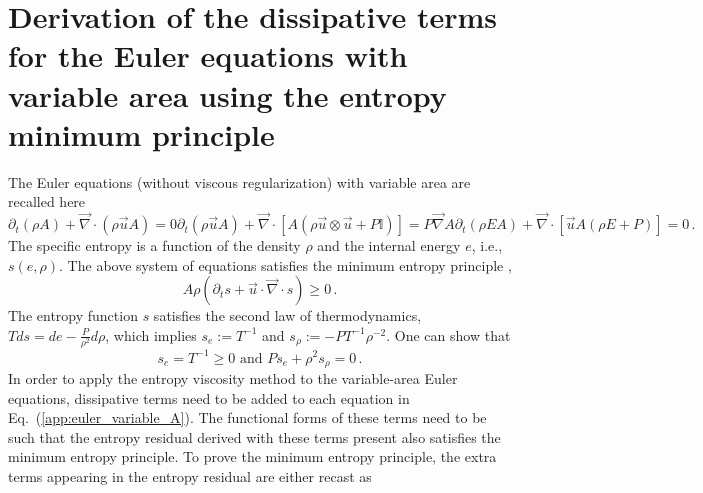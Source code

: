 \documentclass[preprint,10pt]{elsarticle}
\renewcommand{\div}{\vec{\nabla}\! \cdot \!}
\newcommand{\grad}{\vec{\nabla}}
\newcommand{\eqt}[1]{Eq.~(\ref{#1})}                     %
\begin{document}
\section{Derivation of the dissipative terms for the Euler equations with variable area using the entropy minimum principle} \label{app:diss_terms}
%
The Euler equations (without viscous regularization) with variable area are recalled here
%
\begin{subequations}
\label{app:euler_variable_A}
%
\begin{equation}
\partial_t \left( \rho A \right) + \div \left( \rho \vec{u} A \right) = 0 
\end{equation}
%
\begin{equation}
\partial_t \left( \rho \vec{u} A \right) + \div \left[A\left( \rho \vec{u} \otimes \vec{u} + P \mathbb{I} \right) \right] = P \grad A 
\end{equation}
% 
\begin{equation}
\partial_t \left( \rho E A \right) + \div \left[ \vec{u} A \left( \rho E + P \right) \right] = 0 \,.
\end{equation}
\end{subequations}
%
The specific entropy is a function of the density $\rho$ and the internal energy $e$, i.e., $s(e,\rho)$. The 
above system of equations satisfies the minimum entropy principle \cite{Leveque},
%
\begin{equation}
A \rho \left( \partial_t s + \vec{u} \cdot \div s \right) \geq 0 \, .
\end{equation}
%
The entropy function $s$ satisfies the second law of thermodynamics, $T ds = de - \frac{P}{\rho^2} d \rho$, 
which implies $s_e := T^{-1}$ and $s_\rho := -P T^{-1} \rho^{-2}$. One can show that \cite{jlg}
%
\begin{equation}
s_e = T^{-1} \geq 0 \text{ and }
Ps_e + \rho^2 s_{\rho} = 0 \,.
\end{equation}
%
In order to apply the entropy viscosity method to the variable-area Euler equations, dissipative terms need to 
be added to each equation in \eqt{app:euler_variable_A}. The functional forms of these terms need to be such 
that the entropy residual derived with these terms present also satisfies the minimum entropy principle. 
To prove the minimum entropy principle, the extra terms appearing in the entropy residual are either recast as 
\end{document}
